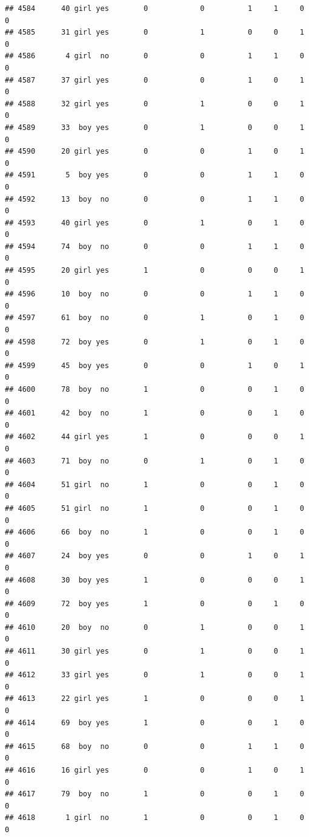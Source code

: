 \documentclass[man]{apa6}
\begin{document}
\begin{verbatim}
## 4584      40 girl yes        0            0          1     1     0     0
## 4585      31 girl yes        0            1          0     0     1     0
## 4586       4 girl  no        0            0          1     1     0     0
## 4587      37 girl yes        0            0          1     0     1     0
## 4588      32 girl yes        0            1          0     0     1     0
## 4589      33  boy yes        0            1          0     0     1     0
## 4590      20 girl yes        0            0          1     0     1     0
## 4591       5  boy yes        0            0          1     1     0     0
## 4592      13  boy  no        0            0          1     1     0     0
## 4593      40 girl yes        0            1          0     1     0     0
## 4594      74  boy  no        0            0          1     1     0     0
## 4595      20 girl yes        1            0          0     0     1     0
## 4596      10  boy  no        0            0          1     1     0     0
## 4597      61  boy  no        0            1          0     1     0     0
## 4598      72  boy yes        0            1          0     1     0     0
## 4599      45  boy yes        0            0          1     0     1     0
## 4600      78  boy  no        1            0          0     1     0     0
## 4601      42  boy  no        1            0          0     1     0     0
## 4602      44 girl yes        1            0          0     0     1     0
## 4603      71  boy  no        0            1          0     1     0     0
## 4604      51 girl  no        1            0          0     1     0     0
## 4605      51 girl  no        1            0          0     1     0     0
## 4606      66  boy  no        1            0          0     1     0     0
## 4607      24  boy yes        0            0          1     0     1     0
## 4608      30  boy yes        1            0          0     0     1     0
## 4609      72  boy yes        1            0          0     1     0     0
## 4610      20  boy  no        0            1          0     0     1     0
## 4611      30 girl yes        0            1          0     0     1     0
## 4612      33 girl yes        0            1          0     0     1     0
## 4613      22 girl yes        1            0          0     0     1     0
## 4614      69  boy yes        1            0          0     1     0     0
## 4615      68  boy  no        0            0          1     1     0     0
## 4616      16 girl yes        0            0          1     0     1     0
## 4617      79  boy  no        1            0          0     1     0     0
## 4618       1 girl  no        1            0          0     1     0     0

\end{verbatim}
\end{document}
